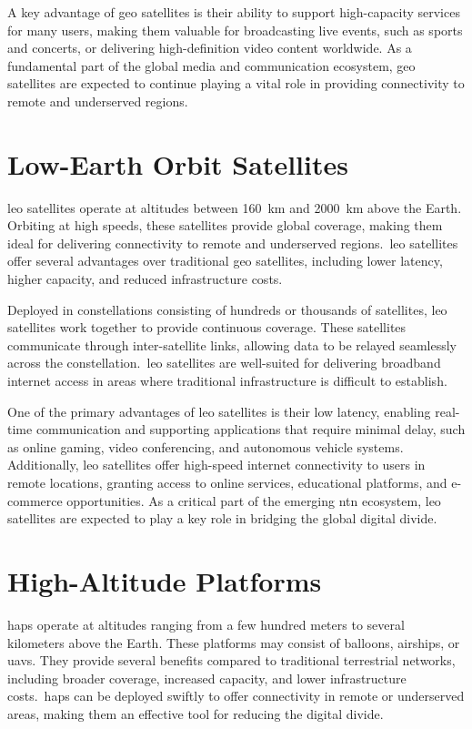 A key advantage of \gls{geo} satellites is their ability to support high-capacity services for many users, making them valuable for broadcasting live events, such as sports and concerts, or delivering high-definition video content worldwide. As a fundamental part of the global media and communication ecosystem, \gls{geo} satellites are expected to continue playing a vital role in providing connectivity to remote and underserved regions.

\section{Low-Earth Orbit Satellites}

\gls{leo} satellites operate at altitudes between \SI{160}{\kilo\meter} and \SI{2000}{\kilo\meter} above the Earth. Orbiting at high speeds, these satellites provide global coverage, making them ideal for delivering connectivity to remote and underserved regions.\ \gls{leo} satellites offer several advantages over traditional \gls{geo} satellites, including lower latency, higher capacity, and reduced infrastructure costs.

Deployed in constellations consisting of hundreds or thousands of satellites, \gls{leo} satellites work together to provide continuous coverage. These satellites communicate through inter-satellite links, allowing data to be relayed seamlessly across the constellation.\ \gls{leo} satellites are well-suited for delivering broadband internet access in areas where traditional infrastructure is difficult to establish.

One of the primary advantages of \gls{leo} satellites is their low latency, enabling real-time communication and supporting applications that require minimal delay, such as online gaming, video conferencing, and autonomous vehicle systems. Additionally, \gls{leo} satellites offer high-speed internet connectivity to users in remote locations, granting access to online services, educational platforms, and e-commerce opportunities. As a critical part of the emerging \gls{ntn} ecosystem, \gls{leo} satellites are expected to play a key role in bridging the global digital divide.

\section{High-Altitude Platforms}

\glspl{hap} operate at altitudes ranging from a few hundred meters to several kilometers above the Earth. These platforms may consist of balloons, airships, or \glspl{uav}. They provide several benefits compared to traditional terrestrial networks, including broader coverage, increased capacity, and lower infrastructure costs.\ \glspl{hap} can be deployed swiftly to offer connectivity in remote or underserved areas, making them an effective tool for reducing the digital divide.

